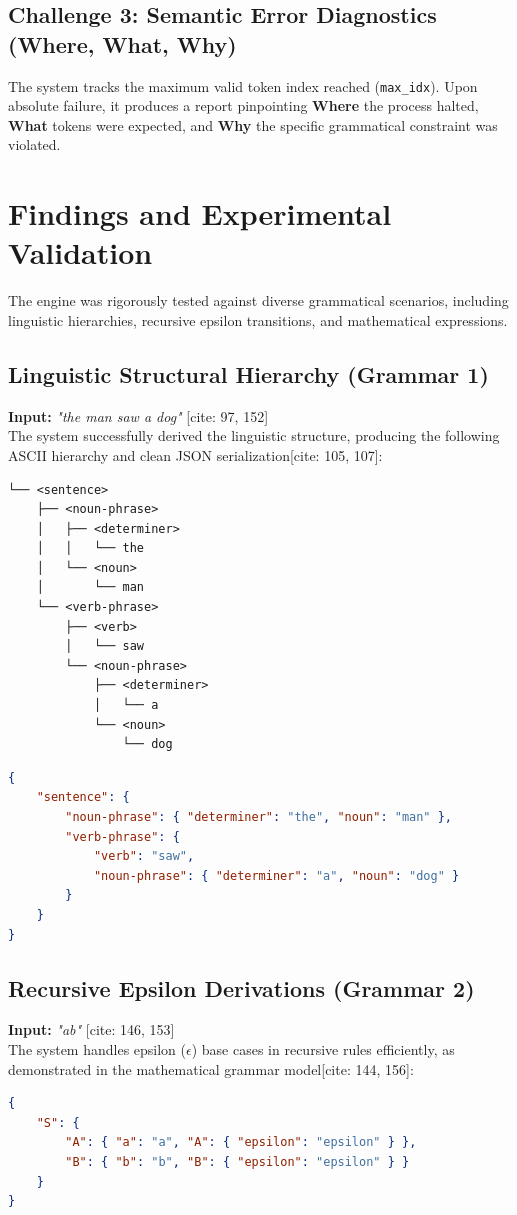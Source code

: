 \documentclass[12pt,a4paper]{article}
\begin{document}
    \subsection{Challenge 3: Semantic Error Diagnostics (Where, What, Why)}
    The system tracks the maximum valid token index reached (\texttt{max\_idx}). Upon absolute failure, it produces a report pinpointing \textbf{Where} the process halted, \textbf{What} tokens were expected, and \textbf{Why} the specific grammatical constraint was violated.

    \section{Findings and Experimental Validation}
    The engine was rigorously tested against diverse grammatical scenarios, including linguistic hierarchies, recursive epsilon transitions, and mathematical expressions.

    \subsection{Linguistic Structural Hierarchy (Grammar 1)}
    \textbf{Input:} \textit{"the man saw a dog"} [cite: 97, 152] \\
    The system successfully derived the linguistic structure, producing the following ASCII hierarchy and clean JSON serialization[cite: 105, 107]:
\begin{verbatim}
└── <sentence>
    ├── <noun-phrase>
    │   ├── <determiner>
    │   │   └── the
    │   └── <noun>
    │       └── man
    └── <verb-phrase>
        ├── <verb>
        │   └── saw
        └── <noun-phrase>
            ├── <determiner>
            │   └── a
            └── <noun>
                └── dog
\end{verbatim}

\begin{lstlisting}[language=json]
{
    "sentence": {
        "noun-phrase": { "determiner": "the", "noun": "man" },
        "verb-phrase": {
            "verb": "saw",
            "noun-phrase": { "determiner": "a", "noun": "dog" }
        }
    }
}
\end{lstlisting}

    \subsection{Recursive Epsilon Derivations (Grammar 2)}
    \textbf{Input:} \textit{"ab"} [cite: 146, 153] \\
    The system handles epsilon ($\epsilon$) base cases in recursive rules efficiently, as demonstrated in the mathematical grammar model[cite: 144, 156]:
\begin{lstlisting}[language=json]
{
    "S": {
        "A": { "a": "a", "A": { "epsilon": "epsilon" } },
        "B": { "b": "b", "B": { "epsilon": "epsilon" } }
    }
}
\end{lstlisting}
\end{document}
